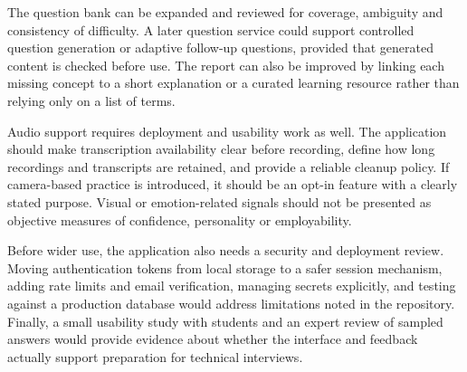 \documentclass[12pt,a4paper,oneside]{report}
\begin{document}
The question bank can be expanded and reviewed for coverage, ambiguity and consistency of difficulty. A later question service could support controlled question generation or adaptive follow-up questions, provided that generated content is checked before use. The report can also be improved by linking each missing concept to a short explanation or a curated learning resource rather than relying only on a list of terms.

Audio support requires deployment and usability work as well. The application should make transcription availability clear before recording, define how long recordings and transcripts are retained, and provide a reliable cleanup policy. If camera-based practice is introduced, it should be an opt-in feature with a clearly stated purpose. Visual or emotion-related signals should not be presented as objective measures of confidence, personality or employability.

Before wider use, the application also needs a security and deployment review. Moving authentication tokens from local storage to a safer session mechanism, adding rate limits and email verification, managing secrets explicitly, and testing against a production database would address limitations noted in the repository. Finally, a small usability study with students and an expert review of sampled answers would provide evidence about whether the interface and feedback actually support preparation for technical interviews.
\end{document}
